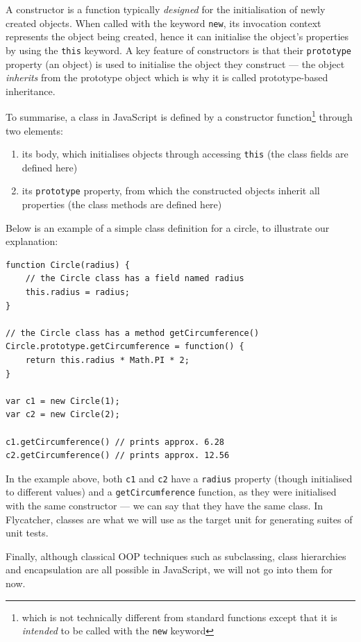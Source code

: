 \documentclass[a4paper,11pt,titlepage]{report}
\begin{document}
A constructor is a function typically \emph{designed} for the initialisation of newly created objects. When called with the keyword \texttt{new}, its invocation context represents the object being created, hence it can initialise the object's properties by using the \texttt{this} keyword. A key feature of constructors is that their \texttt{prototype} property (an object) is used to initialise the object they construct --- the object \emph{inherits} from the prototype object which is why it is called prototype-based inheritance.

To summarise, a class in JavaScript is defined by a constructor function\footnote{which is not technically different from standard functions except that it is \emph{intended} to be called with the \texttt{new} keyword} through two elements:

\begin{enumerate}
   \item its body, which initialises objects through accessing \texttt{this} (the class fields are defined here)
   \item its \texttt{prototype} property, from which the constructed objects inherit all properties (the class methods are defined here)
\end{enumerate}

Below is an example of a simple class definition for a circle, to illustrate our explanation:

\begin{verbatim}
function Circle(radius) {
    // the Circle class has a field named radius
    this.radius = radius;
}

// the Circle class has a method getCircumference()
Circle.prototype.getCircumference = function() {
    return this.radius * Math.PI * 2;
}

var c1 = new Circle(1);
var c2 = new Circle(2);

c1.getCircumference() // prints approx. 6.28
c2.getCircumference() // prints approx. 12.56

\end{verbatim}

In the example above, both \texttt{c1} and \texttt{c2} have a \texttt{radius} property (though initialised to different values) and a \texttt{getCircumference} function, as they were initialised with the same constructor --- we can say that they have the same class. In \textsf{Flycatcher}, classes are what we will use as the target unit for generating suites of unit tests.

Finally, although classical OOP techniques such as subclassing, class hierarchies and encapsulation are all possible in JavaScript, we will not go into them for now.
\end{document}
